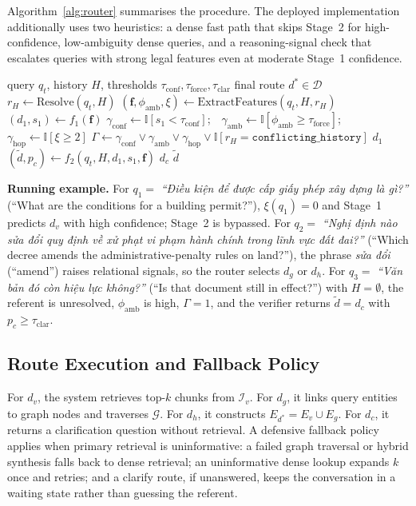 Algorithm~\ref{alg:router} summarises the procedure. The deployed
implementation additionally uses two heuristics: a dense fast path that skips
Stage~2 for high-confidence, low-ambiguity dense queries, and a
reasoning-signal check that escalates queries with strong legal features even
at moderate Stage~1 confidence.

\begin{algorithm}[!htbp]
\caption{Two-stage adaptive router}\label{alg:router}
\begin{algorithmic}[1]
\Require query $q_t$, history $H$, thresholds $\tau_{\mathrm{conf}},\tau_{\mathrm{force}},\tau_{\mathrm{clar}}$
\Ensure final route $d^*\in\mathcal{D}$
\State $r_H \gets \mathrm{Resolve}(q_t,H)$
\State $(\mathbf{f},\phi_{\mathrm{amb}},\xi) \gets \mathrm{ExtractFeatures}(q_t,H,r_H)$
\State $(d_1,s_1) \gets f_1(\mathbf{f})$
\State $\gamma_{\mathrm{conf}}\gets\mathbb{I}[s_1<\tau_{\mathrm{conf}}]$;\ \ $\gamma_{\mathrm{amb}}\gets\mathbb{I}[\phi_{\mathrm{amb}}\ge\tau_{\mathrm{force}}]$;\ \ $\gamma_{\mathrm{hop}}\gets\mathbb{I}[\xi\ge 2]$
\State $\Gamma \gets \gamma_{\mathrm{conf}}\vee\gamma_{\mathrm{amb}}\vee\gamma_{\mathrm{hop}}\vee\mathbb{I}[r_H=\texttt{conflicting\_history}]$
  \State \Return $d_1$
\EndIf
\State $(\tilde{d},p_c) \gets f_2(q_t,H,d_1,s_1,\mathbf{f})$
  \State \Return $d_c$
\Else
  \State \Return $\tilde{d}$ 
\EndIf
\end{algorithmic}
\end{algorithm}

\noindent\textbf{Running example.}
For $q_1=$ \textit{``Điều kiện để được cấp giấy phép xây dựng là gì?''}
(``What are the conditions for a building permit?''), $\xi(q_1)=0$ and Stage~1
predicts $d_v$ with high confidence; Stage~2 is bypassed. For $q_2=$
\textit{``Nghị định nào sửa đổi quy định về xử phạt vi phạm hành chính trong
lĩnh vực đất đai?''} (``Which decree amends the administrative-penalty rules
on land?''), the phrase \textit{sửa đổi} (``amend'') raises relational
signals, so the router selects $d_g$ or $d_h$. For $q_3=$ \textit{``Văn bản đó
còn hiệu lực không?''} (``Is that document still in effect?'') with
$H=\emptyset$, the referent is unresolved, $\phi_{\mathrm{amb}}$ is high,
$\Gamma=1$, and the verifier returns $\tilde{d}=d_c$ with $p_c\ge\tau_{\mathrm{clar}}$.

\subsection{Route Execution and Fallback Policy}\label{subsec:route_execution}

For $d_v$, the system retrieves top-$k$ chunks from $\mathcal{I}_v$. For
$d_g$, it links query entities to graph nodes and traverses $\mathcal{G}$. For
$d_h$, it constructs $E_{d^*}=E_v\cup E_g$. For $d_c$, it returns a
clarification question without retrieval. A defensive fallback policy applies
when primary retrieval is uninformative: a failed graph traversal or hybrid
synthesis falls back to dense retrieval; an uninformative dense lookup expands
$k$ once and retries; and a clarify route, if unanswered, keeps the
conversation in a waiting state rather than guessing the referent.

